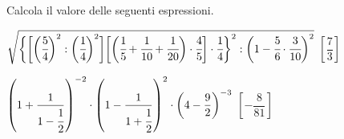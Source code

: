 \begin{esercizio}[\Ast]
\label{ese:3.158}
 Calcola il valore delle seguenti espressioni.
\begin{enumeratea}
\spazielenx
\item $\displaystyle{\sqrt{\bigg\{\bigg[\bigg(\cfrac{5}{4}\bigg)^{2}:
\bigg(\cfrac{1}{4}\bigg)^{2}\bigg]%
\bigg[\bigg(\cfrac{1}{5}+\cfrac{1}{10}+\cfrac{1}{20}\bigg)\cdot\cfrac{4}{5}
\bigg]\cdot\cfrac{1}{4}\bigg\}^{2}%
:\bigg(1-\cfrac{5}{6}\cdot\cfrac{3}{10}\bigg)^{2}}}$
  \hfill \(\left[\dfrac{7}{3} \right]\)
\item $\displaystyle{\left(1+\frac{1}{1-\cfrac{1}{2}}\right)^{-2}\cdot
\left(1-\frac{1}{1+\cfrac{1}{2}}\right)^{2}\cdot%
\bigg(4-\frac{9}{2}\bigg)^{-3}}$
  \hfill \(\left[-\dfrac{8}{81} \right]\)
\end{enumeratea}
\end{esercizio}

